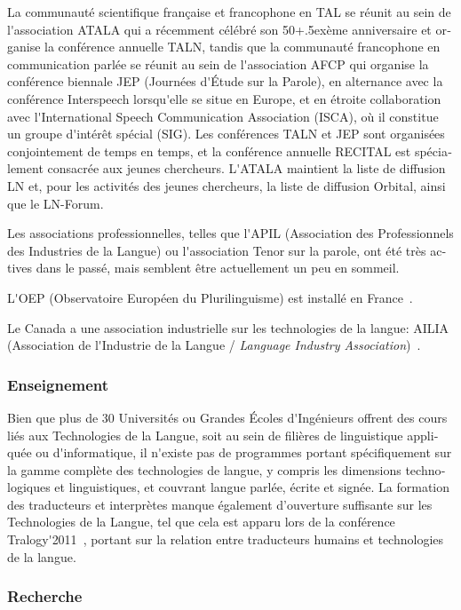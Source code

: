 \begin{french}
\begin{multicols}{2}
La communauté scientifique française et francophone en TAL se réunit
au sein de l{\mbox '}association ATALA qui a récemment célébré son
50\raise+.5ex\hbox{ème} anniversaire et organise la conférence
annuelle TALN, tandis que la communauté francophone en communication
parlée se réunit au sein de l{\mbox '}association AFCP qui organise la
conférence biennale JEP (Journées d{\mbox '}Étude sur la Parole), en
alternance avec la conférence Interspeech lorsqu{\mbox '}elle se situe en
Europe, et en étroite collaboration avec l{\mbox '}International Speech
Communication Association (ISCA), où il constitue un groupe d{\mbox '}intérêt
spécial (SIG). Les conférences TALN et JEP sont organisées
conjointement de temps en temps, et la conférence annuelle RECITAL est
spécialement consacrée aux jeunes chercheurs. L{\mbox '}ATALA maintient la
liste de diffusion LN et, pour les activités des jeunes chercheurs, la
liste de diffusion Orbital, ainsi que le LN-Forum.

Les associations professionnelles, telles que l{\mbox '}APIL (Association des
Professionnels des Industries de la Langue) ou l{\mbox '}association Tenor sur
la parole, ont été très actives dans le passé, mais semblent être
actuellement un peu en sommeil.

L{\mbox '}OEP (Observatoire Européen du Plurilinguisme) est installé en France~\cite{OEP}.

Le Canada a une association industrielle sur les technologies de la langue: AILIA
(Association de l{\mbox '}Industrie de la Langue / {\em Language Industry
Association})~\cite{ailia}.

\subsubsection{Enseignement}
Bien que plus de 30 Universités ou Grandes Écoles d{\mbox '}Ingénieurs
offrent des cours liés aux Technologies de la Langue, soit au sein de
filières de linguistique appliquée ou d{\mbox '}informatique, il
n{\mbox '}existe pas de programmes portant spécifiquement sur la gamme
complète des technologies de langue, y compris les dimensions
technologiques et linguistiques, et couvrant langue parlée, écrite et
signée. La formation des traducteurs et interprètes manque également
d'ouverture suffisante sur les Technologies de la Langue, tel que cela
est apparu lors de la conférence Tralogy{\mbox '}2011~\cite{tralogy},
portant sur la relation entre traducteurs humains et technologies de
la langue.

\subsubsection{Recherche}


\end{multicols}
\end{french}
